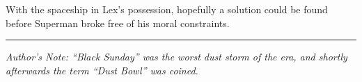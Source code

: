 With the spaceship in Lex's possession, hopefully a solution could be
found before Superman broke free of his moral constraints.

\begin{center}\rule{0.5\linewidth}{0.5pt}\end{center}

\emph{Author's Note: ``Black Sunday'' was the worst dust storm of the
era, and shortly afterwards the term ``Dust Bowl'' was coined.}
